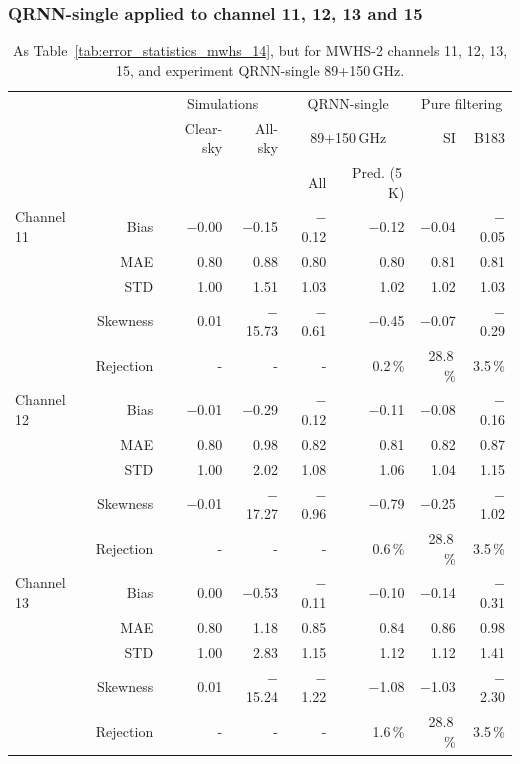\documentclass[amt, manuscript]{copernicus}
\begin{document}
\subsubsection{QRNN-single applied to channel 11, 12, 13 and 15}
\label{sec:mwhs_others}
\begin{table}[t]
	\caption{ As Table~\ref{tab:error_statistics_mwhs_14}, but for MWHS-2 channels 11, 12, 13, 15, and experiment QRNN-single 89+150\,GHz.}
	\label{tab:error_statistics_mwhs_others}
	\begin{tabular}{lrrr|rr|rr}
		\tophline
		&&\multicolumn{2}{c|}{Simulations}& \multicolumn{2}{c|}{QRNN-single} & \multicolumn{2}{c}{Pure filtering} \\
		\cline{2-8}
		& &  Clear-sky &   All-sky &  \multicolumn{2}{c|}{89+150\,GHz}    & SI & B183  \\
		&	&		   &			& All & Pred. (5\,K) &&\\
		\middlehline
		Channel 11  & Bias     &$-$0.00 & $-$0.15 &$-$0.12 &$-$0.12 &$-$0.04 &$-$0.05\\
					& MAE      &  0.80 &   0.88 &  0.80 &  0.80 &  0.81 & 0.81 \\
					& STD      &  1.00 &   1.51 &  1.03 &  1.02 &  1.02 & 1.03 \\
					& Skewness &  0.01 &$-$15.73 &$-$0.61 &$-$0.45 &$-$0.07 &$-$0.29\\
					& Rejection   & -    & -      & -	  & 0.2\,\% & 28.8\,\% & 3.5\,\%  \\
		\middlehline
		Channel 12  &  Bias     &$-$0.01 & $-$0.29 &$-$0.12 &$-$0.11  &$-$0.08 &$-$0.16\\
					&  MAE      &  0.80 &   0.98 &  0.82 &  0.81  &  0.82 & 0.87\\
					&  STD      &  1.00 &   2.02 &  1.08 &  1.06  &  1.04 & 1.15\\
					&  Skewness &$-$0.01 &$-$17.27 &$-$0.96 &$-$0.79  & $-$0.25 &$-$1.02 \\
					& Rejection & -     & -      & -	 & 0.6\,\%  & 28.8\,\% & 3.5\,\%  \\
		\middlehline
		Channel 13  &Bias       & 0.00 & $-$0.53 &$-$0.11 &$-$0.10 &$-$0.14 &$-$0.31\\
					&MAE        & 0.80 &   1.18 &  0.85 &  0.84 &  0.86 & 0.98\\
					&STD        & 1.00 &   2.83 &  1.15 &  1.12 &  1.12 & 1.41 \\
					&Skewness   & 0.01 &$-$15.24 &$-$1.22 &$-$1.08 &$-$1.03 &$-$2.30\\  	
					& Rejection & -     & -      & -	 & 1.6\,\%& 28.8\,\% & 3.5\,\%  \\	

\end{tabular}
\end{table}
\end{document}
